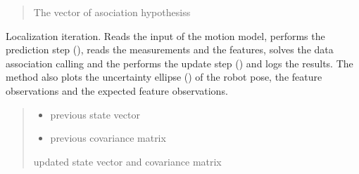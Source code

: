 \documentclass[letterpaper,10pt,english]{sphinxmanual}
\begin{document}
\begin{fulllineitems}
\begin{fulllineitems}
\begin{quote}
\begin{description}
\begin{itemize}
\end{itemize}

\sphinxAtStartPar
The vector of asociation hypothesiss

\end{description}\end{quote}

\end{fulllineitems}


\begin{fulllineitems}
\label{\detokenize{FEKFMBLocalization:FEKFMBL.FEKFMBL.Localize}}
\pysigstartsignatures
{}
\pysigstopsignatures
\sphinxAtStartPar
Localization iteration. Reads the input of the motion model, performs the prediction step ({\hyperref[\detokenize{EKF:EKF.EKF.Prediction}]{}}), reads the measurements
and the features, solves the data association calling {\hyperref[\detokenize{FEKFMBLocalization:FEKFMBL.FEKFMBL.DataAssociation}]{}} and the performs the update step ({\hyperref[\detokenize{EKF:EKF.EKF.Update}]{}}) and logs the results.
The method also plots the uncertainty ellipse ({\hyperref[\detokenize{FEKFMBLocalization:FEKFMBL.FEKFMBL.PlotUncertainty}]{}}) of the robot pose, the feature observations and the expected feature observations.
\begin{quote}\begin{description}
\begin{itemize}
\item {} 
\sphinxAtStartPar
{} \textendash{} previous state vector

\item {} 
\sphinxAtStartPar
{} \textendash{} previous covariance matrix

\end{itemize}

\sphinxAtStartPar
updated state vector and covariance matrix


\end{description}
\end{quote}
\end{fulllineitems}
\end{fulllineitems}
\end{document}
